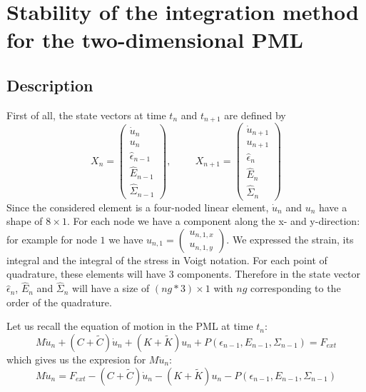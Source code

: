 \section{Stability of the integration method for the two-dimensional PML}
\subsection{Description}
First of all, the state vectors at time $t_n$ and $t_{n+1}$ are defined by
\begin{equation}
X_n = \begin{pmatrix}
\dot{u}_n \\
u_n \\
\hat{\epsilon}_{n-1} \\
\hat{E}_{n-1} \\
\hat{\Sigma}_{n-1}
\end{pmatrix}, \hspace{1cm}
X_{n+1}= \begin{pmatrix}
\dot{u}_{n+1} \\
u_{n+1} \\
\hat{\epsilon}_{n} \\
\hat{E}_{n} \\
\hat{\Sigma}_{n}
\end{pmatrix}
\end{equation}  
Since the considered element is a four-noded linear element, $\dot{u}_n$ and $u_n$ have a shape of $8 \times 1$. For each node we have a component along the x- and y-direction: for example for node $1$ we have $u_{n,1} = \begin{pmatrix}
u_{n,1,x}\\ u_{n,1,y}
\end{pmatrix} $. We expressed the strain, its integral and the integral of the stress in Voigt notation. For each point of quadrature, these elements will have $3$ components. Therefore in the state vector $\hat{\epsilon}_{n}$, $\hat{E}_{n}$ and $\hat{\Sigma}_{n}$ will have a size of $(ng*3) \times 1$ with $ng$ corresponding to the order of the quadrature.   
\par Let us recall the equation of motion in the PML at time $t_n$:
\begin{equation}
M \ddot{u}_n +\left(C+\tilde{C}\right)\dot{u}_n 
+\left(K+\tilde{K}\right)u_n + P(\epsilon_{n-1},E_{n-1},\Sigma_{n-1}) = F_{ext}
\label{eq:motion-pml-tn}
\end{equation}
which gives us the expresion for $M\ddot{u}_n$:
\begin{equation}
M \ddot{u}_n = F_{ext} -\left(C+\tilde{C}\right)\dot{u}_n 
-\left(K+\tilde{K}\right)u_n - P(\epsilon_{n-1},E_{n-1},\Sigma_{n-1})
\label{eq:motion-pml-tn-reorganized}
\end{equation}
